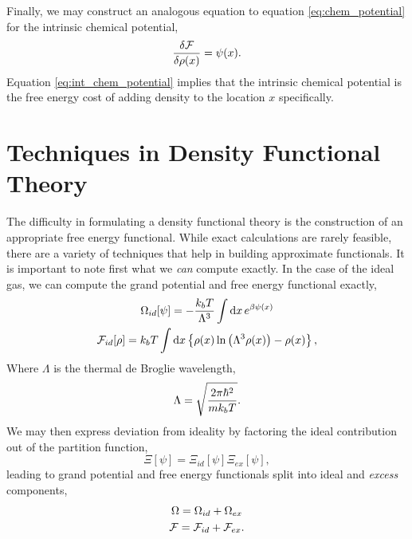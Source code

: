 Finally, we may construct an analogous equation to equation
\ref{eq:chem_potential} for the intrinsic chemical potential,
%
\begin{equation}
    \label{eq:int_chem_potential} 
    \frac{\delta \mathcal{F}}{\delta \rho(x)} = \psi(x).
\end{equation}
%
Equation \ref{eq:int_chem_potential} implies that the intrinsic chemical
potential is the free energy cost of adding density to the location $x$
specifically. 

\section{Techniques in Density Functional Theory} %

The difficulty in formulating a density functional theory is the construction
of an appropriate free energy functional.  While exact calculations are rarely
feasible, there are a variety of techniques that help in building approximate
functionals.  It is important to note first what we \textit{can} compute exactly.
In the case of the ideal gas, we can compute the grand potential and free
energy functional exactly,
%
\begin{gather}
    \Omega_{id}[\psi] = -\frac{k_bT}{\Lambda^{3}} 
        \int\mathrm{d}x\,e^{\beta\psi(x)} \\ 
    \mathcal{F}_{id}[\rho] = k_bT\int \mathrm{d}x
        \left\lbrace \rho(x) \ln\left(\Lambda^3\rho(x)\right) - \rho(x) \right\rbrace,
    \label{F_ideal}
\end{gather}
% 
Where $\Lambda$ is the thermal de Broglie wavelength,
%
\begin{equation}
    \Lambda = \sqrt{\frac{2 \pi \hbar^2}{m k_b T}}.
\end{equation}
%
We may then express deviation from ideality by factoring the ideal contribution
out of the partition function,
%
\begin{equation}
    \Xi[\psi] = \Xi_{id}[\psi]\Xi_{ex}[\psi],
\end{equation}
%
leading to grand potential and free energy functionals split into ideal and
\textit{excess} components,
%
\begin{gather}
    \Omega = \Omega_{id} + \Omega_{ex} \\
    \mathcal{F} = \mathcal{F}_{id} + \mathcal{F}_{ex}.
\end{gather}

